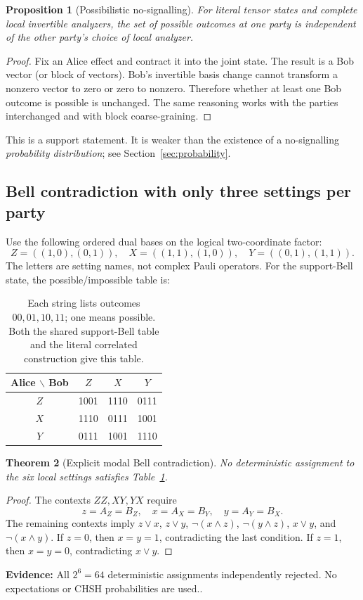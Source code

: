 \documentclass[11pt,a4paper]{article}
\newtheorem{theorem}{Theorem}[section]
\newtheorem{proposition}[theorem]{Proposition}
\theoremstyle{definition}\newtheorem{definition}[theorem]{Definition}
\newcommand{\ev}[1]{\textbf{Evidence:} #1.}
\begin{document}
\begin{proposition}[Possibilistic no-signalling]
For literal tensor states and complete local invertible analyzers, the set of possible outcomes at one party is independent of the other party's choice of local analyzer.
\end{proposition}
\begin{proof}
Fix an Alice effect and contract it into the joint state. The result is a Bob vector (or block of vectors). Bob's invertible basis change cannot transform a nonzero vector to zero or zero to nonzero. Therefore whether at least one Bob outcome is possible is unchanged. The same reasoning works with the parties interchanged and with block coarse-graining.
\end{proof}
This is a support statement. It is weaker than the existence of a no-signalling \emph{probability distribution}; see Section~\ref{sec:probability}.

\subsection{Bell contradiction with only three settings per party}
Use the following ordered dual bases on the logical two-coordinate factor:
\[
 Z=((1,0),(0,1)),\quad X=((1,1),(1,0)),\quad Y=((0,1),(1,1)).
\]
The letters are setting names, not complex Pauli operators. For the support-Bell state, the possible/impossible table is:
\begin{table}[htbp]
\centering
\begin{tabular}{@{}cccc@{}}\toprule
Alice $\backslash$ Bob & $Z$ & $X$ & $Y$\\\midrule
$Z$ & 1001 & 1110 & 0111\\
$X$ & 1110 & 0111 & 1001\\
$Y$ & 0111 & 1001 & 1110\\\bottomrule
\end{tabular}
\caption{Each string lists outcomes $00,01,10,11$; one means possible. Both the shared support-Bell table and the literal correlated construction give this table.}\label{tab:bell}
\end{table}

\begin{theorem}[Explicit modal Bell contradiction]
No deterministic assignment to the six local settings satisfies Table~\ref{tab:bell}.
\end{theorem}
\begin{proof}
The contexts $ZZ,XY,YX$ require
\[
 z=A_Z=B_Z,\quad x=A_X=B_Y,\quad y=A_Y=B_X.
\]
The remaining contexts imply $z\lor x$, $z\lor y$, $\neg(x\wedge z)$, $\neg(y\wedge z)$, $x\lor y$, and $\neg(x\wedge y)$. If $z=0$, then $x=y=1$, contradicting the last condition. If $z=1$, then $x=y=0$, contradicting $x\lor y$.
\end{proof}
\ev{All $2^6=64$ deterministic assignments independently rejected. No expectations or CHSH probabilities are used.}
\end{document}
